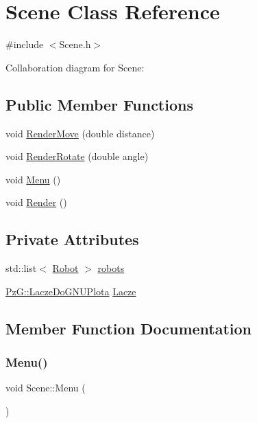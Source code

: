 \hypertarget{classScene}{}\section{Scene Class Reference}
\label{classScene}


{\ttfamily \#include $<$Scene.\+h$>$}



Collaboration diagram for Scene\+:
\subsection*{Public Member Functions}
\begin{DoxyCompactItemize}
\item 
void \hyperlink{classScene_a4c4182f461b3874840a721b3e9828eae}{Render\+Move} (double distance)
\item 
void \hyperlink{classScene_a849cf1c78718f18d5ae36c7ca7a38562}{Render\+Rotate} (double angle)
\item 
void \hyperlink{classScene_ac43d99a498fae214af6a7f52f1ce510b}{Menu} ()
\item 
void \hyperlink{classScene_a91913b921d41d374e00eac347358dc14}{Render} ()
\end{DoxyCompactItemize}
\subsection*{Private Attributes}
\begin{DoxyCompactItemize}
\item 
std\+::list$<$ \hyperlink{classRobot}{Robot} $>$ \hyperlink{classScene_a914e69601e8711bb5b9a06c243854f88}{robots}
\item 
\hyperlink{classPzG_1_1LaczeDoGNUPlota}{Pz\+G\+::\+Lacze\+Do\+G\+N\+U\+Plota} \hyperlink{classScene_a294342f6e251f72e3c41dc6cb95b1df6}{Lacze}
\end{DoxyCompactItemize}


\subsection{Member Function Documentation}
\mbox{\label{classScene_ac43d99a498fae214af6a7f52f1ce510b}} 
\subsubsection{\texorpdfstring{Menu()}{Menu()}}
{\footnotesize\ttfamily void Scene\+::\+Menu (\begin{DoxyParamCaption}{ }\end{DoxyParamCaption})}

